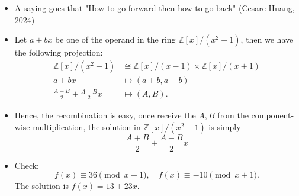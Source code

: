\begin{frame}
    \begin{itemize}
        \item <1->A saying goes that "How to go forward then how to go back" (Cesare Huang, 2024)
        \item <2->Let \(a + b x\) be one of the operand in the ring \( \mathbb{Z}[x]/ (x^{2}-1)\),
            then we have the following projection:
            \begin{align*}
                \mathbb{Z}[x] / (x^{2}-1) &\cong 
                \mathbb{Z}[x] / (x-1) \times 
                \mathbb{Z}[x] / (x+1)  \\
                a + b x &\mapsto (a+b, a-b)\\
                \frac{A+B}{2} + \frac{A-B}{2}x &\mapsto (A,B).
            \end{align*}

        \item <3->Hence, the recombination is easy, once receive the \(A,B\) from the component-wise multiplication, 
              the solution in \( \mathbb{Z}[x] / (x^{2} - 1) \) is simply
              \[
                \frac{A+B}{2} + \frac{A-B}{2}x
              \]

        \item <4->Check:
          \[
            f(x) \equiv 36 \pmod{x-1},\quad 
            f(x) \equiv -10 \pmod{x+1}.
          \]
          The solution is \(f(x) = 13 + 23 x\).
    \end{itemize}
\end{frame}

